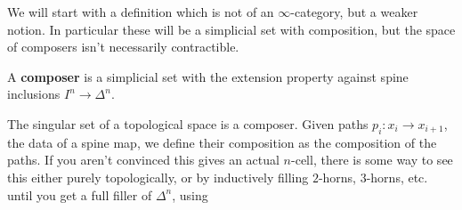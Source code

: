 We will start with a definition which is not of an $\infty$-category, but a weaker notion.
In particular these will be a simplicial set with composition, but the space of composers isn't necessarily contractible.

\begin{definition}
    A \textbf{composer} is a simplicial set with the extension property against spine inclusions $I^n \to \Delta^n$.
\end{definition}

\begin{example}
    The singular set of a topological space is a composer.
    Given paths $p_i : x_i \to x_{i+1}$, the data of a spine map, we define their composition as the composition of the paths.
    If you aren't convinced this gives an actual $n$-cell, there is some way to see this either purely topologically, or by inductively filling $2$-horns, $3$-horns, etc. until you get a full filler of $\Delta^n$, using 
\end{example}